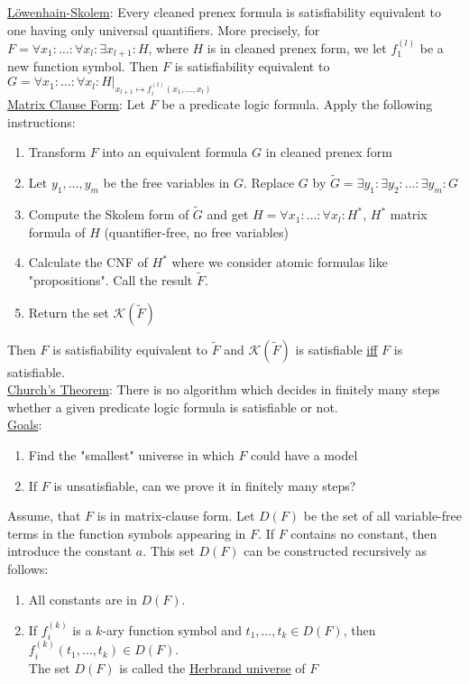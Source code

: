 \documentclass[a4paper]{article}
\newcommand{\ul}{\underline}
\begin{document}
\ul{Löwenhain-Skolem}: Every cleaned prenex formula is satisfiability equivalent to one having only universal quantifiers. More precisely, for $F=\forall x_1:\dots:\forall x_l:\exists x_{l+1}:H$, where $H$ is in cleaned prenex form, we let $f_1^{(l)}$ be a new function symbol. Then $F$ is satisfiability equivalent to  $G=\forall x_1:\dots:\forall x_l:H\vert_{x_{l+1}\mapsto f_i^{(l)}(x_1,\dots,x_l)}$\\
\ul{Matrix Clause Form}: Let $F$ be a predicate logic formula. Apply the following instructions:
\begin{enumerate}[(1)]
	\item Transform $F$ into an equivalent formula $G$ in cleaned prenex form
	\item Let $y_1,\dots,y_m$ be the free variables in $G$. Replace $G$ by $\tilde G=\exists y_1:\exists y_2:\dots:\exists y_m:G$
	\item Compute the Skolem form of $\tilde G$ and get $H=\forall x_1:\dots:\forall x_l:H^*$, $H^*$ matrix formula of $H$ (quantifier-free, no free variables)
	\item Calculate the CNF of $H^*$ where we consider atomic formulas like "propositions". Call the result $\tilde F$.
	\item Return the set $\mathcal{K}(\tilde F)$
\end{enumerate}
Then $F$ is satisfiability equivalent to $\tilde F$ and $\mathcal{K}(\tilde F)$ is satisfiable \ul{iff} $F$ is satisfiable.\\
\ul{Church's Theorem}: There is no algorithm which decides in finitely many steps whether a given predicate logic formula is satisfiable or not.\\
\ul{Goals}:
\begin{enumerate}[(1)]
	\item Find the "smallest" universe in which $F$ could have a model
	\item If $F$ is unsatisfiable, can we prove it in finitely many steps?
\end{enumerate}
Assume, that $F$ is in matrix-clause form.
Let $D(F)$ be the set of all variable-free terms in the function symbols appearing in $F$. If $F$ contains no constant, then introduce the constant $a$. This set $D(F)$ can be constructed recursively as follows:
\begin{enumerate}[(1)]
	\item All constants are in $D(F)$.
	\item If $f_i^{(k)}$ is a $k$-ary function symbol and $t_1,\dots,t_k\in D(F)$, then $f_i^{(k)}(t_1,\dots,t_k)\in D(F)$.\\
	The set $D(F)$ is called the \ul{Herbrand universe} of $F$
\end{enumerate}
\end{document}
